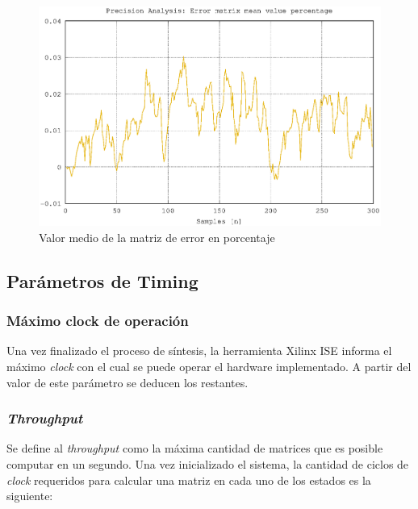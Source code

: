 \begin{figure}[h!]
    \centering
        \includegraphics[width = 12 cm]{./figures/C05-precision_4}
        \caption{Valor medio de la matriz de error en porcentaje}
        \label{fig:precision_4}
\end{figure}

\newpage

\subsection{Parámetros de Timing}

\subsubsection{Máximo clock de operación}

Una vez finalizado el proceso de síntesis, la herramienta Xilinx ISE informa el máximo \textit{clock} con el cual se puede operar el hardware implementado. A partir del valor de este parámetro se deducen los restantes.

\subsubsection{\textit{Throughput}}

Se define al \textit{throughput} como la máxima cantidad de matrices que es posible computar en un segundo. Una vez inicializado el sistema, la cantidad de ciclos de \textit{clock} requeridos para calcular una matriz en cada uno de los estados es la siguiente:

